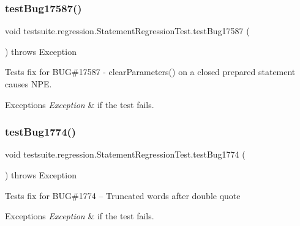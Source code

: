 \subsubsection{\texorpdfstring{test\+Bug17587()}{testBug17587()}}
{\footnotesize\ttfamily void testsuite.\+regression.\+Statement\+Regression\+Test.\+test\+Bug17587 (\begin{DoxyParamCaption}{ }\end{DoxyParamCaption}) throws Exception}

Tests fix for B\+UG\#17587 -\/ clear\+Parameters() on a closed prepared statement causes N\+PE.


\begin{DoxyExceptions}{Exceptions}
{\em Exception} & if the test fails. \\
\hline
\end{DoxyExceptions}
\mbox{\label{classtestsuite_1_1regression_1_1_statement_regression_test_add9e8195c4dbc3b4b95a1bc7ee5f5066}} 
\subsubsection{\texorpdfstring{test\+Bug1774()}{testBug1774()}}
{\footnotesize\ttfamily void testsuite.\+regression.\+Statement\+Regression\+Test.\+test\+Bug1774 (\begin{DoxyParamCaption}{ }\end{DoxyParamCaption}) throws Exception}

Tests fix for B\+UG\#1774 -- Truncated words after double quote


\begin{DoxyExceptions}{Exceptions}
{\em Exception} & if the test fails. \\
\hline
\end{DoxyExceptions}
\mbox{\label{classtestsuite_1_1regression_1_1_statement_regression_test_a0f8ea527be14f3f0a245ffcfb36f0c58}} 

